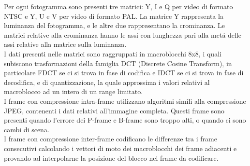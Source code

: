 \documentclass{report}
\begin{document}
Per ogni fotogramma sono presenti tre matrici: Y, I e Q per video di formato NTSC e Y, U e V per video di formato PAL. La matrice Y rappresenta la luminanza del fotogramma, e le altre due rappresentano la crominanza. Le matrici relative alla crominanza hanno le assi con lunghezza pari alla metá delle assi relative alla matrice sulla luminanza. \\
I dati presenti nelle matrici sono raggruppati in macroblocchi 8x8, i quali subiscono trasformazioni della famiglia DCT (Discrete Cosine Transform), in particolare FDCT se ci si trova in fase di codifica e IDCT se ci si trova in fase di decodifica, e di quantizzazione, la quale approssima i valori relativi al macroblocco ad un intero di un range limitato. \\
I frame con compressione intra-frame utilizzano algoritmi simili alla compressione JPEG, contenenti i dati relativi all'immagine completa. Questi frame sono presenti quando l'errore dei P-frame e B-frame sono troppo alti, o quando ci sono cambi di scena. \\
I frame con compressione inter-frame codificano le differenze tra i frame consecutivi calcolando i vettori di moto dei macroblocchi dei frame adiacenti e provando ad interpolarne la posizione del blocco nel frame da codificare. \\

\end{document}
